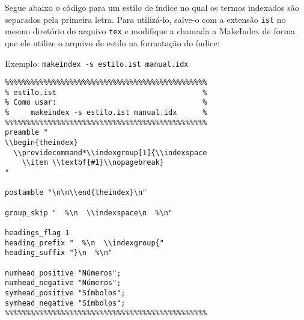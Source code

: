 \documentclass{fei}
\begin{document}
	Segue abaixo o código para um estilo de índice no qual os termos indexados são separados pela primeira letra. Para utilizá-lo, salve-o com a extensão \texttt{ist} no mesmo diretório do arquivo \texttt{tex} e modifique a chamada a MakeIndex de forma que ele utilize o arquivo de estilo na formatação do índice:
	
	Exemplo: \verb+makeindex -s estilo.ist manual.idx+
	
	\begin{verbatim}
%%%%%%%%%%%%%%%%%%%%%%%%%%%%%%%%%%%%%%%%%%%%%%%
% estilo.ist                                  %
% Como usar:                                  %
%     makeindex -s estilo.ist manual.idx      %
%%%%%%%%%%%%%%%%%%%%%%%%%%%%%%%%%%%%%%%%%%%%%%%
preamble "
\\begin{theindex}
  \\providecommand*\\indexgroup[1]{\\indexspace
    \\item \\textbf{#1}\\nopagebreak}
"

postamble "\n\n\\end{theindex}\n"

group_skip "  %\n  \\indexspace\n  %\n"

headings_flag 1
heading_prefix "  %\n  \\indexgroup{"
heading_suffix "}\n  %\n"

numhead_positive "Números";
numhead_negative "Números";
symhead_positive "Símbolos";
symhead_negative "Símbolos";
%%%%%%%%%%%%%%%%%%%%%%%%%%%%%%%%%%%%%%%%%%%%%%%
	\end{verbatim}
	

	\indice
	
\end{document}
